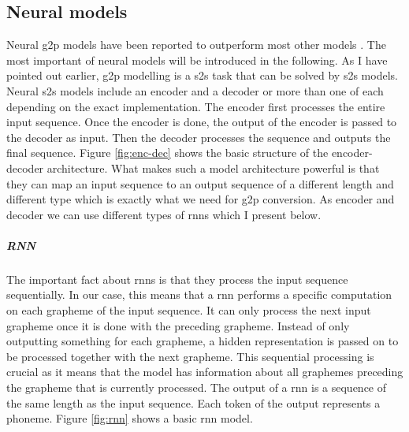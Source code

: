 \subsection{Neural models}
Neural \ac{g2p} models have been reported to outperform most other models \citep{Lee&Ashby.2020}. The most important of neural models will be introduced in the following. As I have pointed out earlier, \ac{g2p} modelling is a \ac{s2s} task that can be solved by \ac{s2s} models. Neural \ac{s2s} models include an encoder and a decoder or more than one of each depending on the exact implementation. The encoder first processes the entire input sequence. Once the encoder is done, the output of the encoder is passed to the decoder as input. Then the decoder processes the sequence and outputs the final sequence. Figure \ref{fig:enc-dec} shows the basic structure of the encoder-decoder architecture. What makes such a model architecture powerful is that they can map an input sequence to an output sequence of a different length and different type which is exactly what we need for \ac{g2p} conversion. As encoder and decoder we can use different types of \acp{rnn} which I present below.


\subparagraph{RNN}
The important fact about \acp{rnn} is that they process the input sequence sequentially. In our case, this means that a \ac{rnn} performs a specific computation on each grapheme of the input sequence. It can only process the next input grapheme once it is done with the preceding grapheme. Instead of only outputting something for each grapheme, a hidden representation is passed on to be processed together with the next grapheme. This sequential processing is crucial as it means that the model has information about all graphemes preceding the grapheme that is currently processed. The output of a \ac{rnn} is a sequence of the same length as the input sequence. Each token of the output represents a phoneme. Figure \ref{fig:rnn} shows a basic \ac{rnn} model. 


